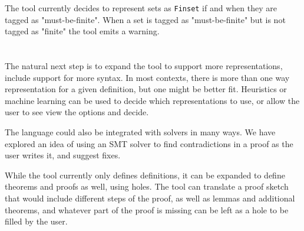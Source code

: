 \documentclass{article}
\makeatletter
\newcommand{\code}{\texttt}
\let\oldsection\section
\renewcommand{\section}{\@ifstar\customsectionstar\customsectionnostar}
\newcommand{\customsectionstar}[1]{\oldsection*{\large#1}\vspace{-0.5em}}
\newcommand{\customsectionnostar}[1]{\oldsection*{\large#1}\vspace{-0.5em}}
\makeatother
\begin{document}
The tool currently decides to represent sets as \code{Finset} if and when they
are tagged as "must-be-finite".
When a set is tagged as "must-be-finite" but is not tagged as "finite" the tool
emits a warning.

\section{Future Work}
The natural next step is to expand the tool to support more representations,
include support for more syntax.
In most contexts, there is more than one way representation for a given
definition, but one might be better fit. Heuristics or machine learning can be
used to decide which representations to use, or allow the user to see view the
options and decide.

The language could also be integrated with solvers in many ways.
We have explored an idea of using an SMT solver to find contradictions in a
proof as the user writes it, and suggest fixes.

While the tool currently only defines definitions, it can be expanded to define
theorems and proofs as well, using holes. The tool can translate a proof sketch
that would include different steps of the proof, as well as lemmas and
additional theorems, and whatever part of the proof is missing can be left as a
hole to be filled by the user.



\end{document}
